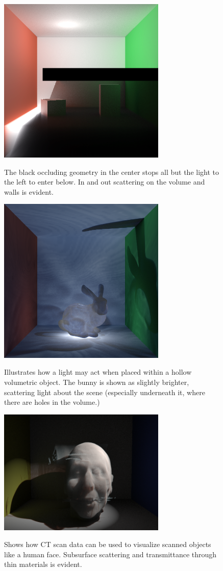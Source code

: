 \documentclass[12pt]{ucthesis}
\newcommand{\captionfonts}{\small\bf\ssp}
\begin{document}
\begin{figure}[h!]
    \centering
    \includegraphics[width=80mm]{img/one_side_corrected.png}
    \captionfonts
    \caption{The black occluding geometry in the center stops all but the light to the left to enter below.  In and out scattering on the volume and walls is evident.}
\end{figure}

\begin{figure}[h!]
    \centering
    \includegraphics[width=80mm]{img/bunny_glow.png}
    \captionfonts
    \caption{Illustrates how a light may act when placed within a hollow volumetric object.  The bunny is shown as slightly brighter, scattering light about the scene (especially underneath it, where there are holes in the volume.)}
\end{figure}

\begin{figure}[h!]
    \centering
    \includegraphics[width=80mm]{img/face1.png}
    \captionfonts
    \caption{Shows how CT scan data can be used to visualize scanned objects like a human face.  Subsurface scattering and transmittance through thin materials is evident.}
\end{figure}
\end{document}

